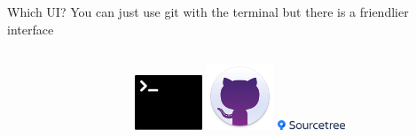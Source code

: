 \documentclass[10pt]{beamer}
\begin{document}
{\begin{frame}[fragile]{Which UI?}
You can just use git with the terminal but there is a friendlier interface\\
\begin{columns}[T]
\begin{column}{.8\textwidth}
\end{column}
\begin{column}{.2\textwidth}
\includegraphics[width=2cm]{Figs/git/terminal} \newline \newline
\includegraphics[width=2cm]{Figs/git/gitdesktop} \newline \newline
\includegraphics[width=2cm]{Figs/git/Sourcetree}
\end{column}
\end{columns}
\end{frame}


}
\end{document}
